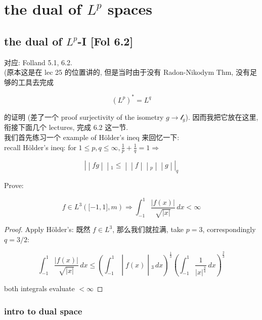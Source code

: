 \chapter{\texorpdfstring{the dual of \(L^{p}\) spaces}{the dual of L\^{}\{p\} spaces}}\label{the-dual-of-lp-spaces}

\section{\texorpdfstring{the dual of \(L^{p}\)-I {[}Fol 6.2{]}}{the dual of L\^{}\{p\}-I {[}Fol 6.2{]}}}

对应: Folland 5.1, 6.2.\\
(原本这是在 lec 25 的位置讲的, 但是当时由于没有 Radon-Nikodym Thm, 没有足够的工具去完成

\[(L^{p})^{\ast} = L^{q}\]

的证明 (差了一个 proof surjectivity of the isometry \(g\rightarrow\mathcal{l}_{g}\)). 因而我把它放在这里, 衔接下面几个 lectures, 完成 6.2 这一节.\\
我们首先练习一个 example of Hölder's ineq 来回忆一下:\\
recall Hölder's ineq: for \(1 \leq p,q \leq \infty,\frac{1}{p} + \frac{1}{q} = 1\Longrightarrow\)

\[\left. | \middle| fg \middle| \middle| {}_{1} \leq \middle| \middle| f \middle| \middle| {}_{p} \middle| \middle| g \middle| |_{q} \right.\]

\begin{example}

Prove:

\[f \in L^{3}(\lbrack - 1,1\rbrack,m)\Longrightarrow\int_{- 1}^{1}\frac{|f(x)|}{\sqrt{|x|}}\, dx < \infty\]

\end{example}

\begin{proof}

Apply Hölder's: 既然 \(f \in L^{3}\), 那么我们就拉满, take \(p = 3\), correspondingly \(q = 3/2\):

\[\left. \int_{- 1}^{1}\frac{|f(x)|}{\sqrt{|x|}}\, dx \leq (\int_{- 1}^{1} \middle| f(x) \middle| {}_{3}\, dx)^{\frac{1}{3}}(\int_{- 1}^{1}\frac{1}{|x|^{\frac{3}{4}}}\, dx)^{\frac{2}{3}} \right.\]

both integrals evaluate \(< \infty\)

\end{proof}

\subsection{intro to dual space}\label{intro-to-dual-space}

